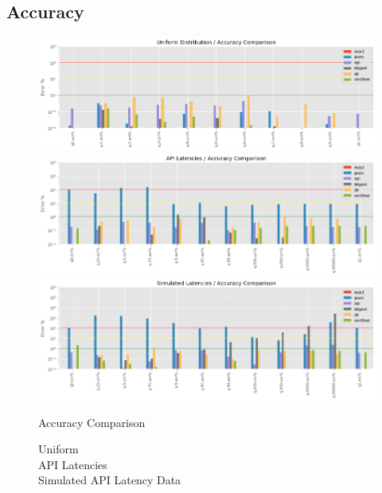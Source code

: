 \documentclass{article}
\theoremstyle{plain}
\theoremstyle{remark}
\begin{document}
\clearpage
\subsection{Accuracy}

\begin{figure}
  \includegraphics[width=\textwidth]{evaluation/images/Uniform_Distribution_accuracy.png}
  \includegraphics[width=\textwidth]{evaluation/images/API_Latencies_accuracy.png}
  \includegraphics[width=\textwidth]{evaluation/images/Simulated_Latencies_accuracy.png}
  \caption{Accuracy Comparison}
\end{figure}

\begin{figure}
  Uniform\\
  
  API Latencies\\
  
  Simulated API Latency Data\\
  
\end{figure}
\end{document}

